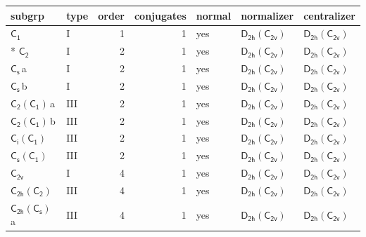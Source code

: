 \documentclass[10pt,a4paper]{article}
\numberwithin{equation}{section}
\newcommand{\grp}[1]{\mathsf{#1}}
\newcommand{\clsletter}[1]{\,{\scriptsize\color{black!55}#1}}
\begin{document}
{\small\begin{longtable}{@{}llrrlll@{}}\toprule
subgrp & type & order & conjugates & normal & normalizer & centralizer\\\midrule\endhead
\bottomrule\endfoot\endlastfoot
\href{../../../rotation/data/pdf/C1.pdf}{$\grp{C_{1}}$} & I & 1 & 1 & yes & \href{D2h-C2v.pdf}{$\grp{D_{2h}}(\grp{C_{2v}})$} & \href{D2h-C2v.pdf}{$\grp{D_{2h}}(\grp{C_{2v}})$}\\*
\href{../../../rotation/data/pdf/C2.pdf}{$\grp{C_{2}}$} & I & 2 & 1 & yes & \href{D2h-C2v.pdf}{$\grp{D_{2h}}(\grp{C_{2v}})$} & \href{D2h-C2v.pdf}{$\grp{D_{2h}}(\grp{C_{2v}})$}\\
\href{../../../rotation/data/pdf/C1v.pdf}{$\grp{C_{s}}$}\clsletter{a} & I & 2 & 1 & yes & \href{D2h-C2v.pdf}{$\grp{D_{2h}}(\grp{C_{2v}})$} & \href{D2h-C2v.pdf}{$\grp{D_{2h}}(\grp{C_{2v}})$}\\
\href{../../../rotation/data/pdf/C1v.pdf}{$\grp{C_{s}}$}\clsletter{b} & I & 2 & 1 & yes & \href{D2h-C2v.pdf}{$\grp{D_{2h}}(\grp{C_{2v}})$} & \href{D2h-C2v.pdf}{$\grp{D_{2h}}(\grp{C_{2v}})$}\\
\href{C2-C1.pdf}{$\grp{C_{2}}(\grp{C_{1}})$}\clsletter{a} & III & 2 & 1 & yes & \href{D2h-C2v.pdf}{$\grp{D_{2h}}(\grp{C_{2v}})$} & \href{D2h-C2v.pdf}{$\grp{D_{2h}}(\grp{C_{2v}})$}\\
\href{C2-C1.pdf}{$\grp{C_{2}}(\grp{C_{1}})$}\clsletter{b} & III & 2 & 1 & yes & \href{D2h-C2v.pdf}{$\grp{D_{2h}}(\grp{C_{2v}})$} & \href{D2h-C2v.pdf}{$\grp{D_{2h}}(\grp{C_{2v}})$}\\
\href{S2-C1.pdf}{$\grp{C_{i}}(\grp{C_{1}})$} & III & 2 & 1 & yes & \href{D2h-C2v.pdf}{$\grp{D_{2h}}(\grp{C_{2v}})$} & \href{D2h-C2v.pdf}{$\grp{D_{2h}}(\grp{C_{2v}})$}\\
\href{C1v-C1.pdf}{$\grp{C_{s}}(\grp{C_{1}})$} & III & 2 & 1 & yes & \href{D2h-C2v.pdf}{$\grp{D_{2h}}(\grp{C_{2v}})$} & \href{D2h-C2v.pdf}{$\grp{D_{2h}}(\grp{C_{2v}})$}\\
\href{../../../rotation/data/pdf/C2v.pdf}{$\grp{C_{2v}}$} & I & 4 & 1 & yes & \href{D2h-C2v.pdf}{$\grp{D_{2h}}(\grp{C_{2v}})$} & \href{D2h-C2v.pdf}{$\grp{D_{2h}}(\grp{C_{2v}})$}\\
\href{C2h-C2.pdf}{$\grp{C_{2h}}(\grp{C_{2}})$} & III & 4 & 1 & yes & \href{D2h-C2v.pdf}{$\grp{D_{2h}}(\grp{C_{2v}})$} & \href{D2h-C2v.pdf}{$\grp{D_{2h}}(\grp{C_{2v}})$}\\
\href{C2h-C1v.pdf}{$\grp{C_{2h}}(\grp{C_{s}})$}\clsletter{a} & III & 4 & 1 & yes & \href{D2h-C2v.pdf}{$\grp{D_{2h}}(\grp{C_{2v}})$} & \href{D2h-C2v.pdf}{$\grp{D_{2h}}(\grp{C_{2v}})$}\\

\end{longtable}}
\end{document}
